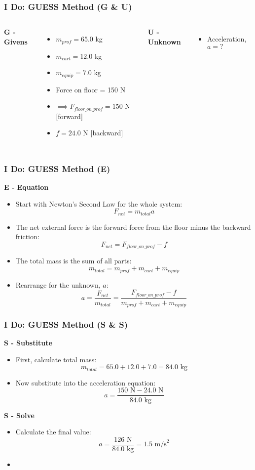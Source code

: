 \documentclass{beamer}
\begin{document}
\begin{frame}
\frametitle{I Do: GUESS Method (G \& U)}
\begin{columns}[T]
\textbf{G - Givens}
\begin{itemize}
\item $m_{prof} = 65.0$ kg
\item $m_{cart} = 12.0$ kg
\item $m_{equip} = 7.0$ kg
\item Force on floor = 150 N
\item $\implies F_{floor\_on\_prof} = 150$ N [forward]
\item $f = 24.0$ N [backward]
\end{itemize}

\textbf{U - Unknown}
\begin{itemize}
\item Acceleration, $a = ?$
\end{itemize}
\end{columns}
\end{frame}

\begin{frame}
\frametitle{I Do: GUESS Method (E)}
\textbf{E - Equation}
\begin{itemize}
    \item Start with Newton's Second Law for the whole system:
    \[ F_{net} = m_{total} a \] \pause
    \item The net external force is the forward force from the floor minus the backward friction:
    \[ F_{net} = F_{floor\_on\_prof} - f \] \pause
    \item The total mass is the sum of all parts:
    \[ m_{total} = m_{prof} + m_{cart} + m_{equip} \] \pause
    \item Rearrange for the unknown, $a$:
    \[ a = \frac{F_{net}}{m_{total}} = \frac{F_{floor\_on\_prof} - f}{m_{prof} + m_{cart} + m_{equip}} \]
\end{itemize}
\end{frame}

\begin{frame}
\frametitle{I Do: GUESS Method (S \& S)}
\textbf{S - Substitute}
\begin{itemize}
    \item First, calculate total mass:
    \[ m_{total} = 65.0 + 12.0 + 7.0 = 84.0 \text{ kg} \]
    \item Now substitute into the acceleration equation:
    \[ a = \frac{150 \text{ N} - 24.0 \text{ N}}{84.0 \text{ kg}} \]
\end{itemize}
\pause
\textbf{S - Solve}
\begin{itemize}
    \item Calculate the final value:
    \[ a = \frac{126 \text{ N}}{84.0 \text{ kg}} = 1.5 \text{ m/s}^2 \]
    \item {}
\end{itemize}
\end{frame}
\end{document}
